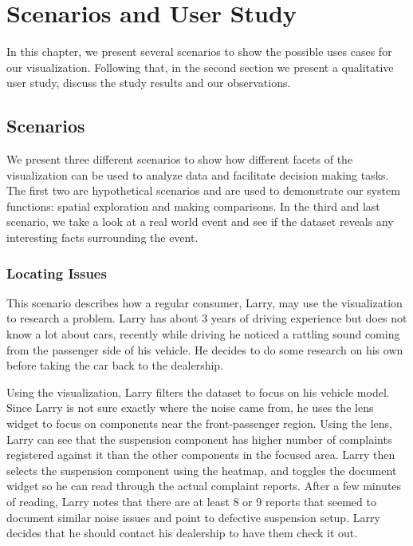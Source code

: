 
\chapter{Scenarios and User Study}
In this chapter, we present several scenarios to show the possible uses cases
for our visualization. Following that, in the second section we present a
qualitative user study, discuss the study results and our observations.

\section{Scenarios}
We present three different scenarios to show how different facets of the
visualization can be used to analyze data and facilitate decision making tasks.
The first two are hypothetical scenarios and are used to demonstrate our system
functions: spatial exploration and making comparisons. In the third and last
scenario, we take a look at a real world event and see if the dataset reveals
any interesting facts surrounding the event.

 
\subsection{Locating Issues}
This scenario describes how a regular consumer, Larry, may use the 
visualization to research a problem. Larry has about 3 years of driving 
experience but does not know a lot about cars, recently while driving he 
noticed a rattling sound coming from the passenger side of his vehicle. 
He decides to do some research on his own before taking the car back 
to the dealership.

Using the visualization, Larry filters the dataset to focus on his
vehicle model. Since Larry is not sure exactly where the noise came from, 
he uses the lens widget to focus on components near the front-passenger 
region. Using the lens, Larry can see that the suspension component has 
higher number of complaints registered against it than the other components 
in the focused area. Larry then selects the suspension component using 
the heatmap, and toggles the document widget so he can read through the 
actual complaint reports. After a few minutes of reading, Larry notes that
there are at least 8 or 9 reports that seemed to document similar noise 
issues and point to defective suspension setup. Larry decides that he 
should contact his dealership to have them check it out.

